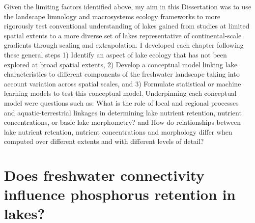 \documentclass[]{msu-thesis}
\theoremstyle{definition}
\theoremstyle{definition}
\theoremstyle{definition}
\theoremstyle{remark}
\begin{document}
Given the limiting factors identified above, my aim in this Dissertation was to use the landscape limnology and macrosystems ecology frameworks to more rigorously test conventional understanding of lakes gained from studies at limited spatial extents to a more diverse set of lakes representative of continental-scale gradients through scaling and extrapolation. I developed each chapter following these general steps 1) Identify an aspect of lake ecology that has not been explored at broad spatial extents, 2) Develop a conceptual model linking lake characteristics to different components of the freshwater landscape taking into account variation across spatial scales, and 3) Formulate statistical or machine learning models to test this conceptual model. Underpinning each conceptual model were questions such as: What is the role of local and regional processes and aquatic-terrestrial linkages in determining lake nutrient retention, nutrient concentrations, or basic lake morphometry? and How do relationships between lake nutrient retention, nutrient concentrations and morphology differ when computed over different extents and with different levels of detail?


\chapter{Does freshwater connectivity influence phosphorus retention in lakes?}\label{intro}

\DoubleSpacing
\end{document}
